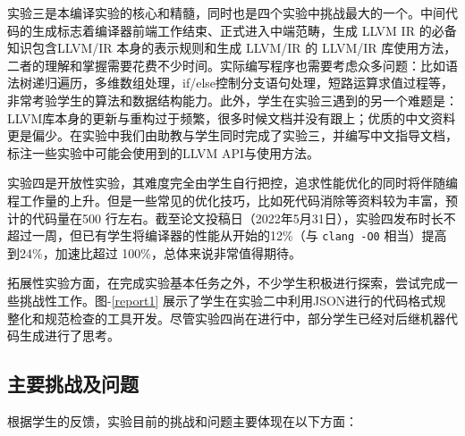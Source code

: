 \documentclass{SCIS2020cn}
\begin{document}
实验三是本编译实验的核心和精髓，同时也是四个实验中挑战最大的一个。中间代码的生成标志着编译器前端工作结束、正式进入中端范畴，生成 LLVM IR 的必备知识包含LLVM/IR 本身\cite{llvm_manual}的表示规则和生成 LLVM/IR 的 LLVM/IR 库使用方法，二者的理解和掌握需要花费不少时间。实际编写程序也需要考虑众多问题：比如语法树递归遍历，多维数组处理，if/else控制分支语句处理，短路运算求值过程等，非常考验学生的算法和数据结构能力。此外，学生在实验三遇到的另一个难题是：LLVM库本身的更新与重构过于频繁，很多时候文档并没有跟上；优质的中文资料更是偏少。在实验中我们由助教与学生同时完成了实验三，并编写中文指导文档，标注一些实验中可能会使用到的LLVM API与使用方法。%


实验四是开放性实验，其难度完全由学生自行把控，追求性能优化的同时将伴随编程工作量的上升。但是一些常见的优化技巧，比如死代码消除等资料较为丰富，预计的代码量在500 行左右。截至论文投稿日（2022年5月31日），实验四发布时长不超过一周，但已有学生将编译器的性能从开始的12\%（与 \texttt{clang -O0} 相当）提高到24\%，加速比超过 100\%，总体来说非常值得期待。

拓展性实验方面，在完成实验基本任务之外，不少学生积极进行探索，尝试完成一些挑战性工作。图-\ref{report1} 展示了学生在实验二中利用JSON进行的代码格式规整化和规范检查的工具开发。尽管实验四尚在进行中，部分学生已经对后继机器代码生成进行了思考。

\subsection{主要挑战及问题}
根据学生的反馈，实验目前的挑战和问题主要体现在以下方面：
\end{document}
